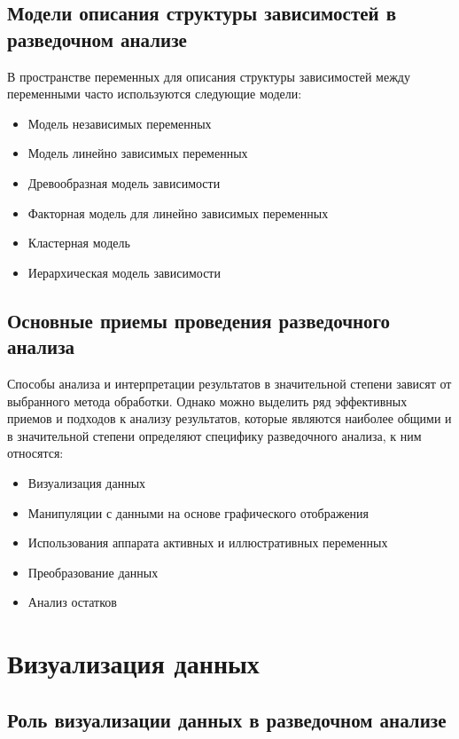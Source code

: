 \documentclass[a4paper, 12pt]{article}
\begin{document}
\subsection{Модели описания структуры зависимостей в разведочном анализе}

В пространстве переменных для описания структуры зависимостей между переменными часто используются следующие модели:
\begin{itemize}
	\item Модель независимых переменных
	\item Модель линейно зависимых переменных
	\item Древообразная модель зависимости
	\item Факторная модель для линейно зависимых переменных
	\item Кластерная модель 
	\item Иерархическая модель зависимости
\end{itemize}

\subsection{Основные приемы проведения разведочного анализа}

Способы анализа и интерпретации результатов в значительной степени зависят от выбранного метода обработки. Однако можно выделить ряд эффективных приемов и подходов к анализу результатов, которые являются наиболее общими и в значительной степени определяют специфику разведочного анализа, к ним относятся:
\begin{itemize}
	\item Визуализация данных
	\item Манипуляции с данными на основе графического отображения
	\item Использования аппарата активных и иллюстративных переменных 
	\item Преобразование данных
	\item Анализ остатков
\end{itemize}



\section{Визуализация данных}

\subsection{Роль визуализации данных в разведочном анализе}
\end{document}
